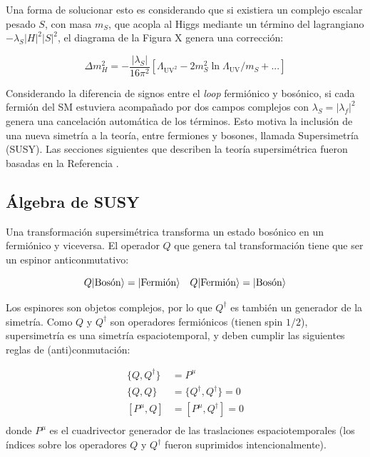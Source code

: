  Una forma de solucionar esto es considerando que si existiera un complejo escalar pesado $S$, con masa $m_S$, que acopla al Higgs mediante un término del lagrangiano $-\lambda_S |H|^2|S|^2$, el diagrama de la Figura X genera una corrección:

\begin{equation}
	\Delta m_H^2 = - \frac{|\lambda_S|}{16 \pi^2}\left[\Lambda_{\text{UV}^2} - 2m_S^2 \ln{\Lambda_{\text{UV}}/m_S} + ... \right]
\end{equation}

Considerando la diferencia de signos entre el \textit{loop} fermiónico y bosónico, si cada fermión del SM estuviera acompañado por dos campos complejos con $\lambda_S = |\lambda_f|^2$ genera una cancelación automática de los términos. Esto motiva la inclusión de una nueva simetría a la teoría, entre fermiones y bosones, llamada Supersimetría (SUSY). Las secciones siguientes que describen la teoría supersimétrica fueron basadas en la Referencia \cite{martin}.

\subsection{Álgebra de SUSY}

Una transformación supersimétrica transforma un estado bosónico en un fermiónico y viceversa. El operador $Q$ que genera tal transformación tiene que ser un espinor anticonmutativo:

\begin{equation}
	Q\lvert\text{Bosón}\rangle = \lvert\text{Fermión}\rangle \quad Q\lvert\text{Fermión}\rangle = \lvert\text{Bosón}\rangle
\end{equation}

Los espinores son objetos complejos, por lo que $Q^{\dagger}$ es también un generador de la simetría. Como $Q$ y $Q^{\dagger}$ son operadores fermiónicos (tienen spin $1/2$), supersimetría es una simetría espaciotemporal, y deben cumplir las siguientes reglas de (anti)conmutación:

\begin{equation}
	\begin{split}	
		\{Q,Q^{\dagger}\} & = P^{\mu}\\
		\{Q,Q\} & = \{Q^{\dagger},Q^{\dagger}\} = 0\\
		[P^{\mu},Q] & = [P^{\mu},Q^{\dagger}] = 0\\
	\end{split}	
\end{equation}
%
donde $P^{\mu}$ es el cuadrivector generador de las traslaciones espaciotemporales (los índices sobre los operadores $Q$ y $Q^{\dagger}$ fueron suprimidos intencionalmente).


